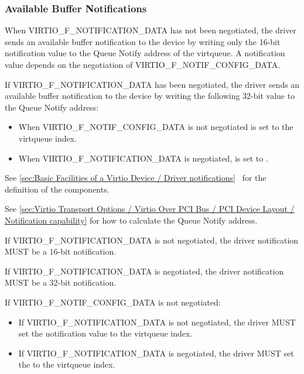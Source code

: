 \subsubsection{Available Buffer Notifications}\label{sec:Virtio Transport Options / Virtio Over PCI Bus / PCI-specific Initialization And Device Operation / Available Buffer Notifications}

When VIRTIO_F_NOTIFICATION_DATA has not been negotiated,
the driver sends an available buffer notification to the device by writing
only the 16-bit notification value to the Queue Notify address of the
virtqueue. A notification value depends on the negotiation of
VIRTIO_F_NOTIF_CONFIG_DATA.

If VIRTIO_F_NOTIFICATION_DATA has been negotiated, the driver sends an
available buffer notification to the device by writing the following 32-bit
value to the Queue Notify address:


\begin{itemize}
\item When VIRTIO_F_NOTIF_CONFIG_DATA is not negotiated  is set
to the virtqueue index.

\item When VIRTIO_F_NOTIFICATION_DATA is negotiated,
 is set to .
\end{itemize}

See \ref{sec:Basic Facilities of a Virtio Device / Driver notifications}~
for the definition of the components.

See \ref{sec:Virtio Transport Options / Virtio Over PCI Bus / PCI Device Layout / Notification capability}
for how to calculate the Queue Notify address.


If VIRTIO_F_NOTIFICATION_DATA is not negotiated, the driver notification
MUST be a 16-bit notification.

If VIRTIO_F_NOTIFICATION_DATA is negotiated, the driver notification
MUST be a 32-bit notification.

If VIRTIO_F_NOTIF_CONFIG_DATA is not negotiated:
\begin{itemize}
\item If VIRTIO_F_NOTIFICATION_DATA is not negotiated, the driver MUST set the
notification value to the virtqueue index.

\item If VIRTIO_F_NOTIFICATION_DATA is negotiated, the driver MUST set the
 to the virtqueue index.

\end{itemize}

